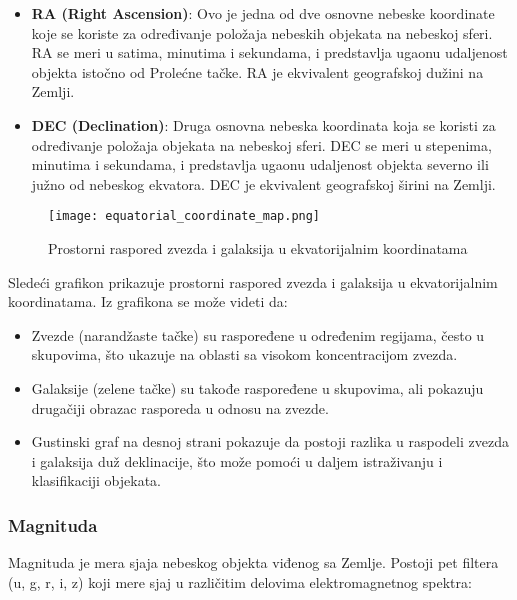 \documentclass[a4paper,12pt]{article}
\begin{document}
\begin{itemize}
    \item \textbf{RA (Right Ascension)}: Ovo je jedna od dve osnovne nebeske koordinate koje se koriste za određivanje položaja nebeskih objekata na nebeskoj sferi. RA se meri u satima, minutima i sekundama, i predstavlja ugaonu udaljenost objekta istočno od Prolećne tačke. RA je ekvivalent geografskoj dužini na Zemlji.
    
    \item \textbf{DEC (Declination)}: Druga osnovna nebeska koordinata koja se koristi za određivanje položaja objekata na nebeskoj sferi. DEC se meri u stepenima, minutima i sekundama, i predstavlja ugaonu udaljenost objekta severno ili južno od nebeskog ekvatora. DEC je ekvivalent geografskoj širini na Zemlji.
\end{itemize}

\begin{figure}[h!]
\centering
\texttt{[image: equatorial\_coordinate\_map.png]}
\caption{Prostorni raspored zvezda i galaksija u ekvatorijalnim koordinatama}
\label{fig:equatorial_coordinates}
\end{figure}

Sledeći grafikon prikazuje prostorni raspored zvezda i galaksija u ekvatorijalnim koordinatama. Iz grafikona se može videti da:

\begin{itemize}
    \item Zvezde (narandžaste tačke) su raspoređene u određenim regijama, često u skupovima, što ukazuje na oblasti sa visokom koncentracijom zvezda.
    \item Galaksije (zelene tačke) su takođe raspoređene u skupovima, ali pokazuju drugačiji obrazac rasporeda u odnosu na zvezde.
    \item Gustinski graf na desnoj strani pokazuje da postoji razlika u raspodeli zvezda i galaksija duž deklinacije, što može pomoći u daljem istraživanju i klasifikaciji objekata.
\end{itemize}

\subsubsection{Magnituda}

Magnituda je mera sjaja nebeskog objekta viđenog sa Zemlje. Postoji pet filtera (u, g, r, i, z) koji mere sjaj u različitim delovima elektromagnetnog spektra:
\end{document}
